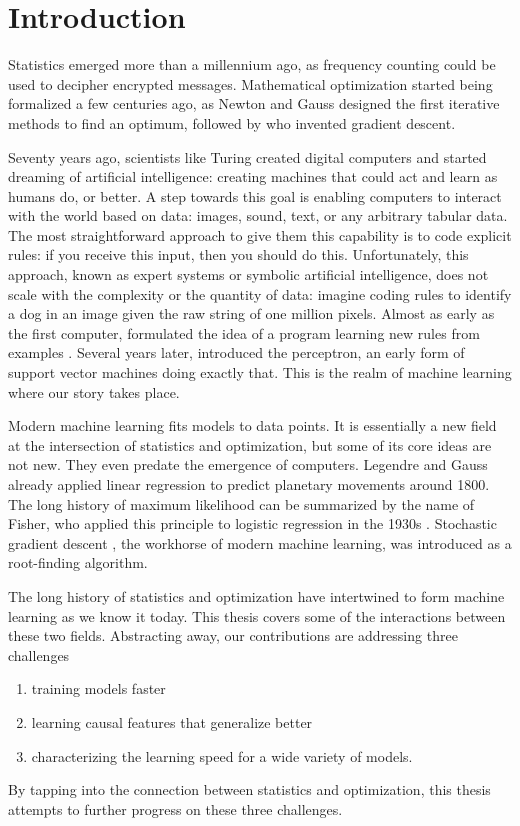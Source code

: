 \setcounter{theorem}{0}

\chapter{Introduction}

Statistics emerged more than a millennium ago, as frequency counting could be used to decipher encrypted messages.
Mathematical optimization started being formalized a few centuries ago, as
Newton and Gauss designed the first iterative methods to find an optimum, followed by \citet{cauchy1847methode}  who invented gradient descent.

Seventy years ago, scientists like Turing created digital computers and started dreaming of artificial intelligence: creating machines that could act and learn as humans do, or better.
A step towards this goal is enabling computers to interact with the world based on data: images, sound, text, or any arbitrary tabular data.
The most straightforward approach to give them this capability is to code explicit rules: if you receive this input, then you should do this.
Unfortunately, this approach, known as expert systems or symbolic artificial intelligence, does not scale with the complexity or the quantity of data:
imagine coding rules to identify a dog in an image given the raw string of one million pixels.
Almost as early as the first computer,  \citet{turing1950computing} formulated the idea of a program learning new rules from examples \citep{muggleton2014alan}.
Several years later, \citet{rosenblatt1957perceptron} introduced the perceptron, an early form of support vector machines doing exactly that.
This is the realm of machine learning where our story takes place.


Modern machine learning fits models to data points.
It is essentially a new field at the intersection of statistics and optimization, but some of its core ideas are not new.
They even predate the emergence of computers.
Legendre and Gauss already applied linear regression to predict planetary movements around 1800.
The long history of maximum likelihood can be summarized by the name of Fisher, who applied this principle to logistic regression in the 1930s \citep{stigler2007epic}.
Stochastic gradient descent \citep{robbins1951stochastic}, the workhorse of modern machine learning, was introduced as a root-finding algorithm.

The long history of statistics and optimization have intertwined to form machine learning as we know it today.
This thesis covers some of the interactions between these two fields.
Abstracting away, our contributions are  addressing three challenges
\begin{enumerate}
	\item training models faster
	\item learning causal features that generalize better
	\item characterizing the learning speed for a wide variety of models.
\end{enumerate}
By tapping into the connection between statistics and optimization, this thesis attempts to further progress on these three challenges.

